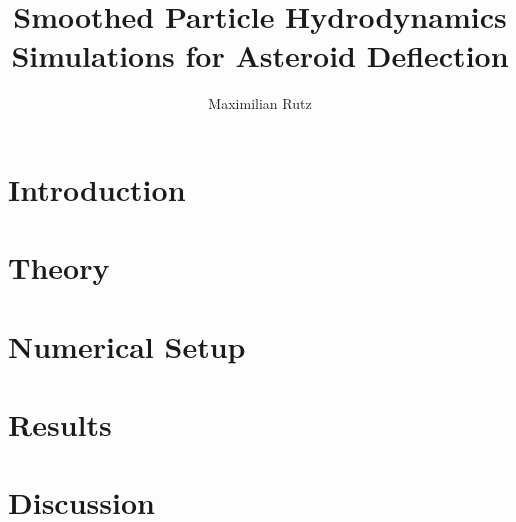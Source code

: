 \documentclass{article}
\title{Smoothed Particle Hydrodynamics Simulations for Asteroid Deflection}
\author{Maximilian Rutz}
\date{}
\begin{document}
\maketitle
\begin{abstract}
   
\end{abstract}

\newpage
\tableofcontents

\newpage
\section{Introduction}

\newpage
\section{Theory}

\newpage
\section{Numerical Setup}

\newpage
\section{Results}

\newpage
\section{Discussion}


\newpage
\printbibliography
\end{document}
